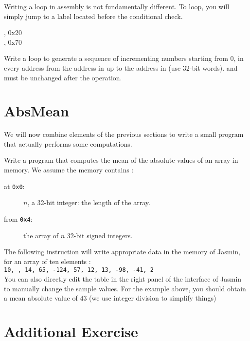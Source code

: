\documentclass{../../tp}
\begin{document}
Writing a loop in assembly is not fundamentally different. To loop, you will simply jump to a label located before the conditional check.

\begin{instruction}
	
	{\ttfamily {} , 0x20 \\
		 , 0x70 \\}	
	
Write a loop to generate a sequence of incrementing numbers 
starting from 0, in every address from the address in  
up to the address in  (use 32-bit words).
 and  must be unchanged after the operation.
\end{instruction}


\section{AbsMean}

We will now combine elements of the previous sections to write a small program that actually performs some computations. 

\begin{instruction}

Write a program that computes the mean of the absolute values of an array in memory.  
We assume the memory contains :
\begin{description}
	\item[at \texttt{0x0}:] $n$, a 32-bit integer: the length of the array.
	\item[from \texttt{0x4}:] the array of $n$ 32-bit signed integers.
\end{description}
 	 
The following instruction will write appropriate data in the memory of \textsf{Jasmin}, for an array of ten elements : \\

 \qquad \texttt{10, ,  14,  65, -124, 57, 12, 13, -98, -41, 2} \\
 
	  
You can also directly edit the table in the right panel of the interface of \textsf{Jasmin} to manually change the sample values. For the example above, you should obtain a mean absolute value of 43 (we use integer division to simplify things)
\end{instruction}


\section{Additional Exercise}
\end{document}
